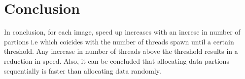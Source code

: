 \section{Conclusion}
In conclusion, for each image, speed up increases with an increse in number of partions i.e which coicides with the number of threads spawn until a certain threshold. Any increase in number of threads above the threshold results in a reduction in speed. Also, it can be concluded that allocating data partions sequentially is faster than allocating data randomly. 